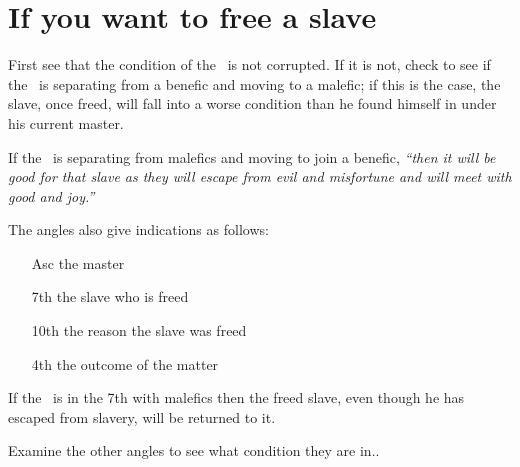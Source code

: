 \section{If you want to free a slave}
First see that the condition of the \Moon\, is not corrupted. If it is not, check to see if the \Moon\, is separating from a benefic and moving to a malefic; if this is the case, the slave, once freed, will fall into a worse condition than he found himself in under his current master.

If the \Moon\, is separating from malefics and moving to join a benefic, \textsl{``then it will be good for that slave as they will escape from evil and misfortune and will meet with good and joy.''}

The angles also give indications as follows:
\begin{itemize}[topsep=0em,itemsep=0em]
\item[Asc] the master
\item[7th] the slave who is freed
\item[10th] the reason the slave was freed
\item[4th] the outcome of the matter
\end{itemize}

If the \Moon\, is in the 7th with malefics then the freed slave, even though he has escaped from slavery, will be returned to it.

Examine the other angles to see what condition they are in..